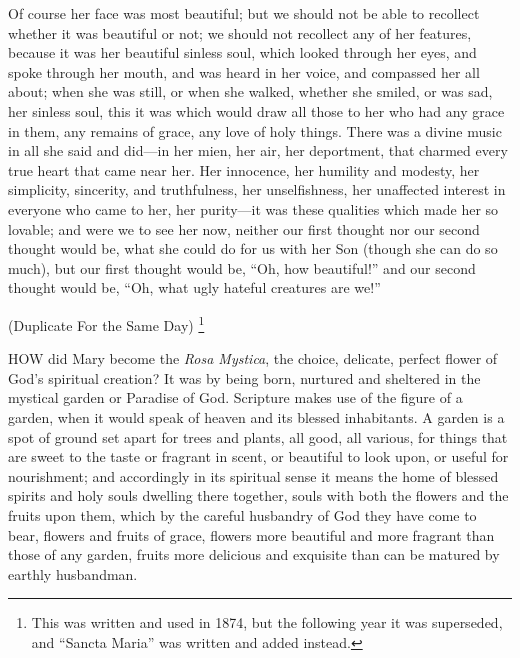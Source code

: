 Of course her face was most
beautiful; but we should not be able to recollect whether it was
beautiful or not; we should not recollect any of her features, because
it was her beautiful sinless soul, which looked through her eyes, and
spoke through her mouth, and was heard in her voice, and compassed her
all about; when she was still, or when she walked, whether she smiled,
or was sad, her sinless soul, this it was which would draw all those to
her who had any grace in them, any remains of grace, any love of holy
things. There was a divine music in all she said and did—in her mien,
her air, her deportment, that charmed every true heart that came near
her. Her innocence, her humility and modesty, her simplicity, sincerity,
and truthfulness, her unselfishness, her unaffected interest in everyone
who came to her, her purity—it was these qualities which made her so
lovable; and were we to see her now, neither our first thought nor our
second thought would be, what she could do for us with her Son (though
she can do so much), but our first thought would be, ``Oh, how beautiful!''
and our second thought would be, ``Oh, what ugly hateful creatures are
we!''



(Duplicate
For the Same Day) \footnote{

This was written and used in
1874, but the following year it was superseded, and ``Sancta Maria'' was
written and added instead.}

HOW
did Mary become the \emph{Rosa Mystica}, the choice, delicate, perfect
flower of God's spiritual creation? It was by being born, nurtured and
sheltered in the mystical garden or Paradise of God. Scripture makes use
of the figure of a garden, when it would speak of heaven and its blessed
inhabitants. A garden is a spot of ground set apart for trees and
plants, all good, all various, for things that are sweet to the taste or
fragrant in scent, or beautiful to look upon, or useful for nourishment;
and accordingly in its spiritual sense it means the home of blessed
spirits and holy souls dwelling there together, souls with both the
flowers and the fruits upon them, which by the careful husbandry of God
they have come to bear, flowers and fruits of grace, flowers more
beautiful and more fragrant than those of any garden, fruits more
delicious and exquisite than can be matured by earthly husbandman.

